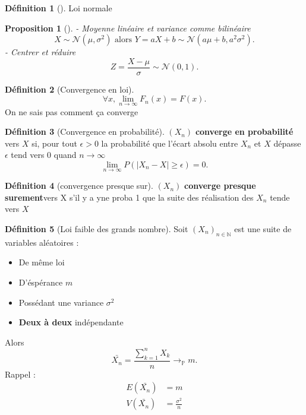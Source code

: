 \documentclass{article}
\theoremstyle{plain}%
\newtheorem{prop}[thm]{Proposition}
\theoremstyle{definition}
\newtheorem{defn}{Définition}[section]
\theoremstyle{remark}
\begin{document}
\begin{defn}[]
    Loi normale 
    \begin{prop}[]
        - Moyenne linéaire et variance comme bilinéaire
        \[
            X \sim \mathcal{N}(\mu , \sigma ^2) \text{ alors } Y = aX + b \sim \mathcal{N}(a \mu + b , a^2 \sigma ^2)
        .\]
        - Centrer et réduire 
        \[
            Z = \frac{X - \mu }{\sigma } \sim \mathcal{N}(0,1)
        .\]
        
    \end{prop}
\end{defn}

\begin{defn}[Convergence en loi]
    \[
        \forall x, \lim_{n \to \infty} F_n(x) = F(x)
    .\]
    On ne sais pas comment ça converge
\end{defn}

\begin{defn}[Convergence en probabilité]
    $ (X_n) $ \textbf{converge en probabilité} vers $ X $ si, pour tout $ \epsilon > 0 $ la probabilité que l'écart absolu entre $ X_n $ et $ X $ dépasse $ \epsilon  $ tend vers 0 quand $ n \to \infty  $ 
    \[
        \lim_{n \to \infty} P(|X_n-X|\geq \epsilon ) = 0
    .\]
\end{defn}

\begin{defn}[convergence presque sur]
    $ (X_n) $ \textbf{converge presque surement}vers X s'il y a yne proba 1 que la suite des réalisation des $ X_n $ tende vers $ X $ 
\end{defn}

\begin{defn}[Loi faible des grands nombre]
    Soit $ (X_n)_{n \in \mathbb{N}} $ est une suite de variables aléatoires :\begin{itemize}
        \item De même loi
        \item D'éspérance $ m $ 
        \item Possédant une variance $ \sigma ^2 $ 
        \item \textbf{Deux à deux} indépendante
    \end{itemize}
    Alors 
    \[
        \bar{X_n} = \frac{\sum_{k=1}^{n} X_k}{n}  \to _\mathbb{P} m
    .\]
    Rappel : 
    \begin{align*}
        E(\bar{X_n}) &= m \\
        V(\bar{X_n}) &= \frac{\sigma ^2}{n}
    \end{align*}
\end{defn}
\end{document}
